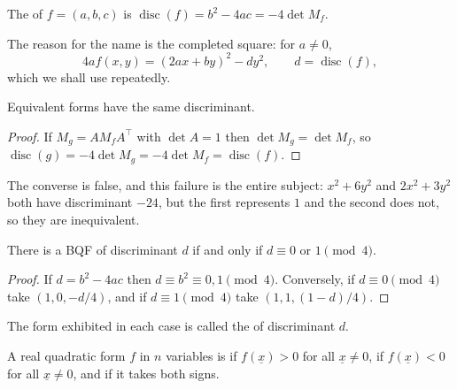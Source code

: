 \documentclass[a4paper]{scrartcl}
\DeclareMathOperator{\disc}{disc}
\begin{document}
\begin{definition}
	The  of $f = (a,b,c)$ is $\disc(f) = b^2 - 4ac = -4\det M_f$.
\end{definition}

The reason for the name is the completed square: for $a \neq 0$,
$$
4af(x,y) = (2ax + by)^2 - dy^2, \qquad d = \disc(f),
$$
which we shall use repeatedly.

\begin{lemma}
	Equivalent forms have the same discriminant.
\end{lemma}
\begin{proof}
	If $M_g = AM_fA^\intercal$ with $\det A = 1$ then $\det M_g = \det M_f$, so $\disc(g) = -4\det M_g = -4\det M_f = \disc(f)$.
\end{proof}

The converse is false, and this failure is the entire subject: $x^2 + 6y^2$ and $2x^2 + 3y^2$ both have discriminant $-24$, but the first represents $1$ and the second does not, so they are inequivalent.

\begin{lemma}
	There is a BQF of discriminant $d$ if and only if $d \equiv 0$ or $1 \pmod 4$.
\end{lemma}
\begin{proof}
	If $d = b^2 - 4ac$ then $d \equiv b^2 \equiv 0, 1 \pmod 4$. Conversely, if $d \equiv 0 \pmod 4$ take $(1, 0, -d/4)$, and if $d \equiv 1 \pmod 4$ take $(1, 1, (1-d)/4)$.
\end{proof}

The form exhibited in each case is called the  of discriminant $d$.

\begin{definition}
	A real quadratic form $f$ in $n$ variables is  if $f(\underline x) > 0$ for all $\underline x \neq 0$,  if $f(\underline x) < 0$ for all $\underline x \neq 0$, and  if it takes both signs.
\end{definition}
\end{document}
